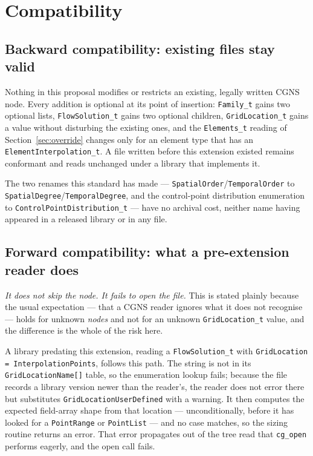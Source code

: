\documentclass[11pt,letterpaper]{article}
\newif\ifvfourdraft
\newenvironment{v4block}{\ifvfourdraft\color{v4violet}\fi\ignorespaces}{\par}
\newcommand{\vfourmark}{\ifvfourdraft\textcolor{v4violet}{\textbf{[v4]}}\ \fi}
\begin{document}
\begin{v4block}
\section{\vfourmark Compatibility}
\label{sec:compatibility}

\subsection{Backward compatibility: existing files stay valid}

Nothing in this proposal modifies or restricts an existing, legally written CGNS
node.  Every addition is optional at its point of insertion: \texttt{Family\_t}
gains two optional lists, \texttt{FlowSolution\_t} gains two optional children,
\texttt{GridLocation\_t} gains a value without disturbing the existing ones, and
the \texttt{Elements\_t} reading of Section~\ref{sec:override} changes only for an
element type that has an \texttt{ElementInterpolation\_t}.  A file written before
this extension existed remains conformant and reads unchanged under a library that
implements it.

The two renames this standard has made ---
\texttt{SpatialOrder}/\allowbreak\texttt{TemporalOrder} to
\texttt{SpatialDegree}/\allowbreak\texttt{TemporalDegree}, and the control-point
distribution enumeration to \texttt{ControlPointDistribution\_t} --- have no
archival cost, neither name having appeared in a released library or in any file.

\subsection{Forward compatibility: what a pre-extension reader does}

\emph{It does not skip the node.  It fails to open the file.}  This is stated
plainly because the usual expectation --- that a CGNS reader ignores what it does
not recognise --- holds for unknown \emph{nodes} and not for an unknown
\texttt{GridLocation\_t} value, and the difference is the whole of the risk here.

A library predating this extension, reading a \texttt{FlowSolution\_t} with
\texttt{GridLocation = InterpolationPoints}, follows this path.  The string is not
in its \texttt{GridLocationName[]} table, so the enumeration lookup fails; because
the file records a library version newer than the reader's, the reader does not
error there but substitutes \texttt{GridLocationUserDefined} with a warning.  It
then computes the expected field-array shape from that location --- unconditionally,
before it has looked for a \texttt{PointRange} or \texttt{PointList} --- and no case
matches, so the sizing routine returns an error.  That error propagates out of the
tree read that \texttt{cg\_open} performs eagerly, and the open call fails.


\end{v4block}
\end{document}
